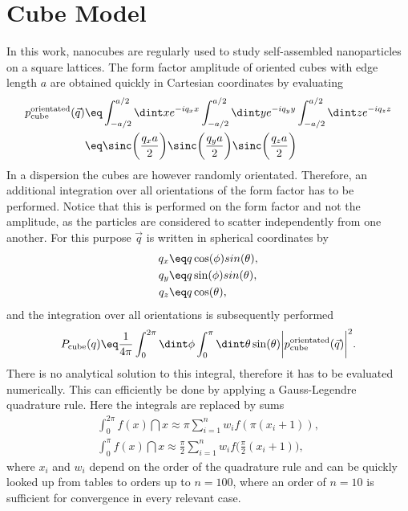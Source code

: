 \documentclass[\main/dresen_thesis.tex]{subfiles}
\begin{document}
\section{Cube Model}\label{ch:appendix:formfactors:cube}
In this work, nanocubes are regularly used to study self-assembled nanoparticles on a square lattices.
The form factor amplitude of oriented cubes with edge length $a$ are obtained quickly in Cartesian coordinates by evaluating
\begin{align}
  p^\mathrm{orientated}_\mathrm{cube} (\vec{q})
  \eq & \int_{-a/2}^{a/2} \dint x e^{-i q_x x} \int_{-a/2}^{a/2} \dint y e^{-i q_y y} \int_{-a/2}^{a/2} \dint z e^{-i q_z z} \\
  \eq & \sinc \biggl(\frac{q_x a}{2} \biggr)\sinc\biggl(\frac{q_y a}{2} \biggr)\sinc\biggl(\frac{q_z a}{2} \biggr)
\end{align}
In a dispersion the cubes are however randomly orientated. Therefore, an additional integration over all orientations of the form factor has to be performed. Notice that this is performed on the form factor and not the amplitude, as the particles are considered to scatter independently from one another. For this purpose $\vec{q}$ is written in spherical coordinates by
\begin{align}
  q_x \eq& q \cos(\phi) sin(\theta),\\
  q_y \eq& q \sin(\phi) sin(\theta),\\
  q_z \eq& q \cos(\theta),\\
\end{align}
and the integration over all orientations is subsequently performed
\begin{align}
  P_\mathrm{cube} (q) \eq \frac{1}{4 \pi} \int_0^{2\pi} \dint \phi \int_0^{\pi} \dint \theta \sin(\theta) \biggl| p^\mathrm{orientated}_\mathrm{cube} (\vec{q}) \biggr|^2.
\end{align}
There is no analytical solution to this integral, therefore it has to be evaluated numerically. This can efficiently be done by applying a Gauss-Legendre quadrature rule. Here the integrals are replaced by sums 
\begin{align}
  \int_0^{2\pi} f(x) \dint x \approx \pi \sum_{i=1}^n w_i f(\pi (x_i + 1)),\\
  \int_0^{\pi} f(x) \dint x \approx \frac{\pi}{2} \sum_{i=1}^n w_i f\biggl(\frac{\pi}{2} (x_i + 1) \biggr),
\end{align}
where $x_i$ and $w_i$ depend on the order of the quadrature rule and can be quickly looked up from tables to orders up to $n = 100$, where an order of $n = 10$ is sufficient for convergence in every relevant case.
\end{document}
